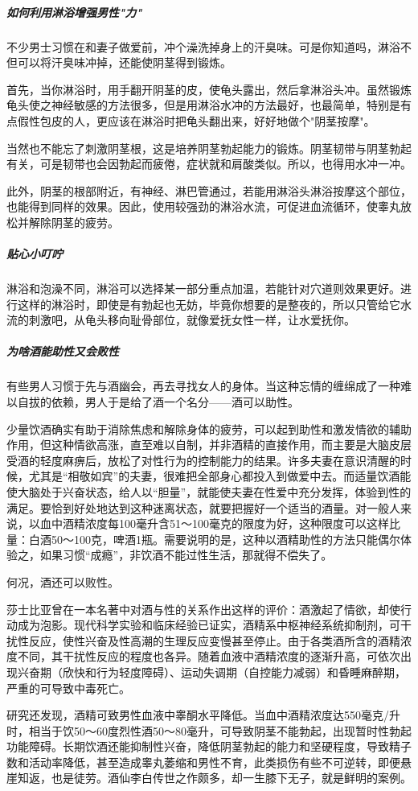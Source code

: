 \subparagraph{如何利用淋浴增强男性"力"}

不少男士习惯在和妻子做爱前，冲个澡洗掉身上的汗臭味。可是你知道吗，淋浴不但可以将汗臭味冲掉，还能使阴茎得到锻炼。

首先，当你淋浴时，用手翻开阴茎的皮，使龟头露出，然后拿淋浴头冲。虽然锻炼龟头使之神经敏感的方法很多，但是用淋浴水冲的方法最好，也最简单，特别是有点假性包皮的人，更应该在淋浴时把龟头翻出来，好好地做个"阴茎按摩"。

当然也不能忘了刺激阴茎根，这是培养阴茎勃起能力的锻炼。阴茎韧带与阴茎勃起有关，可是韧带也会因勃起而疲倦，症状就和肩酸类似。所以，也得用水冲一冲。

此外，阴茎的根部附近，有神经、淋巴管通过，若能用淋浴头淋浴按摩这个部位，也能得到同样的效果。因此，使用较强劲的淋浴水流，可促进血流循环，使睾丸放松并解除阴茎的疲劳。

\subparagraph{贴心小叮咛}

淋浴和泡澡不同，淋浴可以选择某一部分重点加温，若能针对穴道则效果更好。进行这样的淋浴时，即使是有勃起也无妨，毕竟你想要的是整夜的，所以只管给它水流的刺激吧，从龟头移向耻骨部位，就像爱抚女性一样，让水爱抚你。

\subparagraph{为啥酒能助性又会败性}

有些男人习惯于先与酒幽会，再去寻找女人的身体。当这种忘情的缠绵成了一种难以自拔的依赖，男人于是给了酒一个名分——酒可以助性。

少量饮酒确实有助于消除焦虑和解除身体的疲劳，可以起到助性和激发情欲的辅助作用，但这种情欲高涨，直至难以自制，并非酒精的直接作用，而主要是大脑皮层受酒的轻度麻痹后，放松了对性行为的控制能力的结果。许多夫妻在意识清醒的时候，尤其是“相敬如宾”的夫妻，很难把全部身心都投入到做爱中去。而适量饮酒能使大脑处于兴奋状态，给人以“胆量”，就能使夫妻在性爱中充分发挥，体验到性的满足。要恰到好处地达到这种迷离状态，就要把握好一个适当的酒量。对一般人来说，以血中酒精浓度每100毫升含51～100毫克的限度为好，这种限度可以这样比量：白酒50～100克，啤酒1瓶。需要说明的是，这种以酒精助性的方法只能偶尔体验之，如果习惯“成瘾”，非饮酒不能过性生活，那就得不偿失了。

何况，酒还可以败性。

莎士比亚曾在一本名著中对酒与性的关系作出这样的评价：酒激起了情欲，却使行动成为泡影。现代科学实验和临床经验已证实，酒精系中枢神经系统抑制剂，可干扰性反应，使性兴奋及性高潮的生理反应变慢甚至停止。由于各类酒所含的酒精浓度不同，其干扰性反应的程度也各异。随着血液中酒精浓度的逐渐升高，可依次出现兴奋期（欣快和行为轻度障碍）、运动失调期（自控能力减弱）和昏睡麻醉期，严重的可导致中毒死亡。

研究还发现，酒精可致男性血液中睾酮水平降低。当血中酒精浓度达550毫克/升时，相当于饮50～60度烈性酒50～80毫升，可导致阴茎不能勃起，出现暂时性勃起功能障碍。长期饮酒还能抑制性兴奋，降低阴茎勃起的能力和坚硬程度，导致精子数和活动率降低，甚至造成睾丸萎缩和男性不育，此类损伤有些不可逆转，即便悬崖知返，也是徒劳。酒仙李白传世之作颇多，却一生膝下无子，就是鲜明的案例。

